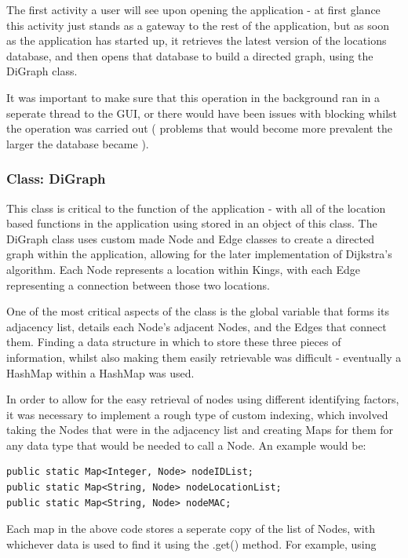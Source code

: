 \documentclass[11pt]{informatics-report}
\begin{document}
The first activity a user will see upon opening the application - at first glance this activity just stands as a gateway to the rest of the application, but as soon as the application has started up, it retrieves the latest version of the locations database, and then opens that database to build a directed graph, using the DiGraph class.

It was important to make sure that this operation in the background ran in a seperate thread to the GUI, or there would have been issues with blocking whilst the operation was carried out ( problems that would become more prevalent the larger the database became ).

\subsubsection{Class: DiGraph} 

This class is critical to the function of the application - with all of the location based functions in the application using stored in an object of this class. The DiGraph class uses custom made Node and Edge classes to create a directed graph within the application, allowing for the later implementation of Dijkstra's algorithm. Each Node represents a location within Kings, with each Edge representing a connection between those two locations.

One of the most critical aspects of the class is the global variable that forms its adjacency list, details each Node's adjacent Nodes, and the Edges that connect them. Finding a data structure in which to store these three pieces of information, whilst also making them easily retrievable was difficult - eventually a HashMap within a HashMap was used. 

In order to allow for the easy retrieval of nodes using different identifying factors, it was necessary to implement a rough type of custom indexing, which involved taking the Nodes that were in the adjacency list and creating Maps for them for any data type that would be needed to call a Node. An example would be:

\begin{lstlisting}[frame=single]
public static Map<Integer, Node> nodeIDList;
public static Map<String, Node> nodeLocationList;
public static Map<String, Node> nodeMAC;  
\end{lstlisting}

Each map in the above code stores a seperate copy of the list of Nodes, with whichever data is used to find it using the .get() method. For example, using 
\end{document}
